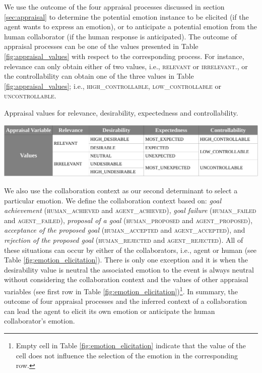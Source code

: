 \documentclass[12pt]{report}
\begin{document}
We use the outcome of the four appraisal processes discussed in section
\ref{sec:appraisal} to determine the potential emotion instance to be elicited
(if the agent wants to express an emotion), or to anticipate a potential emotion
from the human collaborator (if the human response is anticipated). The outcome
of appraisal processes can be one of the values presented in Table
\ref{fig:appraisal_values} with respect to the corresponding process.
{\color{red}For instance, relevance can only obtain either of two values,
i.e., \textsc{relevant} or \textsc{irrelevant}., or the controllability can
obtain one of the three values in Table \ref{fig:appraisal_values}; i.e.,
\textsc{high\_controllable, low\_controllable} or \textsc{uncontrollable}.}

\vspace*{5mm}
\begin{table}[tbh]
  \centering
  \caption{Appraisal values for relevance, desirability, expectedness and
  controllability.}
  \label{fig:appraisal_values}
  \vspace*{-3mm}
  \includegraphics[width=1\textwidth]{figure/apraisal_values_croped.pdf}
\end{table}

We also use the collaboration context as our second determinant to select a
particular emotion. We define the collaboration context based on: \textit{goal
achievement} (\textsc{human\_achieved} and \textsc{agent\_achieved}),
\textit{goal failure} (\textsc{human\_failed} and \textsc{agent\_failed}),
\textit{proposal of a goal} (\textsc{human\_proposed} and
\textsc{agent\_proposed}), \textit{acceptance of the proposed goal}
(\textsc{human\_accepted} and \textsc{agent\_accepted}), and \textit{rejection
of the proposed goal} (\textsc{human\_rejected} and \textsc{agent\_rejected}).
All of these situations can occur by either of the collaborators, i.e., agent or
human (see Table \ref{fig:emotion_elicitation}). There is only one exception
and it is when the desirability value is neutral the associated emotion to the
event is always neutral without considering the collaboration context and the
values of other appraisal variables (see first row in Table
\ref{fig:emotion_elicitation})\footnote{{\color{red}Empty cell in Table
\ref{fig:emotion_elicitation} indicate that the value of the cell does not
influence the selection of the emotion in the corresponding row.}}.
{\color{red}In summary, the outcome of four appraisal processes and the inferred
context of a collaboration can lead the agent to elicit its own emotion or
anticipate the human collaborator's emotion.}
\end{document}
